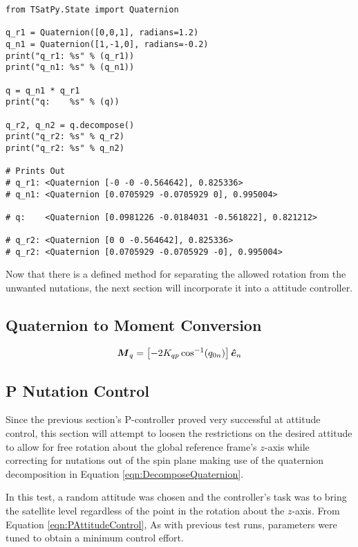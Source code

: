 \begin{singlespace}
  \begin{verbatim}
from TSatPy.State import Quaternion

q_r1 = Quaternion([0,0,1], radians=1.2)
q_n1 = Quaternion([1,-1,0], radians=-0.2)
print("q_r1: %s" % (q_r1))
print("q_n1: %s" % (q_n1))

q = q_n1 * q_r1
print("q:    %s" % (q))

q_r2, q_n2 = q.decompose()
print("q_r2: %s" % q_r2)
print("q_r2: %s" % q_n2)

# Prints Out
# q_r1: <Quaternion [-0 -0 -0.564642], 0.825336>
# q_n1: <Quaternion [0.0705929 -0.0705929 0], 0.995004>

# q:    <Quaternion [0.0981226 -0.0184031 -0.561822], 0.821212>

# q_r2: <Quaternion [0 0 -0.564642], 0.825336>
# q_r2: <Quaternion [0.0705929 -0.0705929 -0], 0.995004>
  \end{verbatim}
\nocite{minted}
\end{singlespace}

Now that there is a defined method for separating the allowed rotation from the unwanted nutations, the next section will incorporate it into a attitude controller.

\subsection{Quaternion to Moment Conversion}

\begin{equation}
  \boldsymbol{M}_{q} = \left[-2 K_{qp} \cos^{-1} (q_{0n}) \right] \boldsymbol{\hat{e}}_n
  \label{eqn:PNutationControl}
\end{equation}


\subsection{P Nutation Control}
\label{subsec:PNutationControl}

Since the previous section's P-controller proved very successful at attitude control, this section will attempt to loosen the restrictions on the desired attitude to allow for free rotation about the global reference frame's $z$-axis while correcting for nutations out of the spin plane making use of the quaternion decomposition in Equation \ref{eqn:DecomposeQuaternion}.

In this test, a random attitude was chosen and the controller's task was to bring the satellite level regardless of the point in the rotation about the $z$-axis.  From Equation \ref{eqn:PAttitudeControl},    As with previous test runs, parameters were tuned to obtain a minimum control effort.

